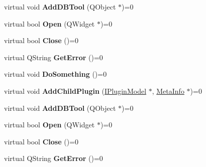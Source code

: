 \begin{DoxyCompactItemize}
\item 
\mbox{\label{class_i_plugin_model_a2db1262756c4a587fd6cd2d7191841fb}} 
virtual void {\bfseries Add\+D\+B\+Tool} (Q\+Object $\ast$)=0
\item 
\mbox{\label{class_i_plugin_model_ac1c51202f69db707ca56e8f3c78ce163}} 
virtual bool {\bfseries Open} (Q\+Widget $\ast$)=0
\item 
\mbox{\label{class_i_plugin_model_a3f9ce2298f73283fec68fc908db14e57}} 
virtual bool {\bfseries Close} ()=0
\item 
\mbox{\label{class_i_plugin_model_ad42778c15ce3e8fdb9524a6dfd61792a}} 
virtual Q\+String {\bfseries Get\+Error} ()=0
\item 
\mbox{\label{class_i_plugin_model_a377627e683f892ffda2c6225d975251b}} 
virtual void {\bfseries Do\+Something} ()=0
\item 
\mbox{\label{class_i_plugin_model_aff406b0571f6dc77488c315e0df0f563}} 
virtual void {\bfseries Add\+Child\+Plugin} (\hyperlink{class_i_plugin_model}{I\+Plugin\+Model} $\ast$, \hyperlink{struct_meta_info}{Meta\+Info} $\ast$)=0
\item 
\mbox{\label{class_i_plugin_model_a2db1262756c4a587fd6cd2d7191841fb}} 
virtual void {\bfseries Add\+D\+B\+Tool} (Q\+Object $\ast$)=0
\item 
\mbox{\label{class_i_plugin_model_ac1c51202f69db707ca56e8f3c78ce163}} 
virtual bool {\bfseries Open} (Q\+Widget $\ast$)=0
\item 
\mbox{\label{class_i_plugin_model_a3f9ce2298f73283fec68fc908db14e57}} 
virtual bool {\bfseries Close} ()=0
\item 
\mbox{\label{class_i_plugin_model_ad42778c15ce3e8fdb9524a6dfd61792a}} 
virtual Q\+String {\bfseries Get\+Error} ()=0
\item 
\mbox{\label{class_i_plugin_model_a377627e683f892ffda2c6225d975251b}} 

\end{DoxyCompactItemize}
